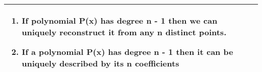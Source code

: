 {\tabulinesep=1mm
\begin{tabu}{|p{16cm} |}
\hline
\begin{enumerate} \item If polynomial P(x) has degree n - 1 then we 
can uniquely reconstruct it from any n distinct points. \item If a 
polynomial P(x) has degree n - 1 then it can be uniquely described 
by its n coefficients \end{enumerate}\\
\hline
\end{tabu}
}